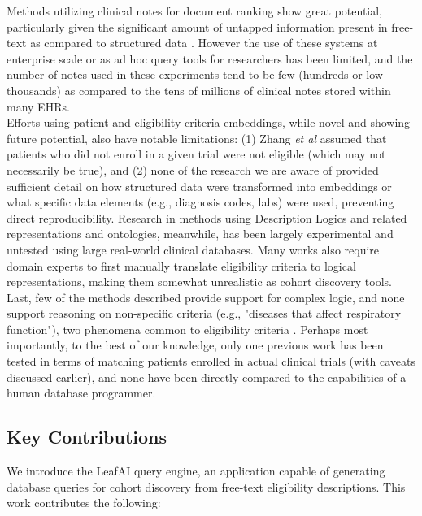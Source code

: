 \documentclass[../main.tex]{subfiles}
\begin{document}
\noindent Methods utilizing clinical notes for document ranking show great potential, particularly given the significant amount of untapped information present in free-text as compared to structured data \cite{warrer2012using}. However the use of these systems at enterprise scale or as ad hoc query tools for researchers has been limited, and the number of notes used in these experiments tend to be few (hundreds or low thousands) as compared to the tens of millions of clinical notes stored within many EHRs. \\

\noindent Efforts using patient and eligibility criteria embeddings, while novel and showing future potential, also have notable limitations: (1) Zhang \textit{et al} assumed that patients who did not enroll in a given trial were not eligible (which may not necessarily be true), and (2) none of the research we are aware of provided sufficient detail on how structured data were transformed into embeddings or what specific data elements (e.g., diagnosis codes, labs) were used, preventing direct reproducibility.  Research in methods using Description Logics and related representations and ontologies, meanwhile, has been largely experimental and untested using large real-world clinical databases. Many works also require domain experts to first manually translate eligibility criteria to logical representations, making them somewhat unrealistic as cohort discovery tools. \\

\noindent Last, few of the methods described provide support for complex logic, and none support reasoning on non-specific criteria (e.g., "diseases that affect respiratory function"), two phenomena common to eligibility criteria \cite{wang2017classifying, ross2010analysis}. Perhaps most importantly, to the best of our knowledge, only one previous work has been tested in terms of matching patients enrolled in actual clinical trials \cite{zhang2020deepenroll} (with caveats discussed earlier), and none have been directly compared to the capabilities of a human database programmer. 

\subsection*{Key Contributions}

\noindent We introduce the LeafAI query engine, an application capable of generating database queries for cohort discovery from free-text eligibility descriptions. This work contributes the following:
\end{document}
